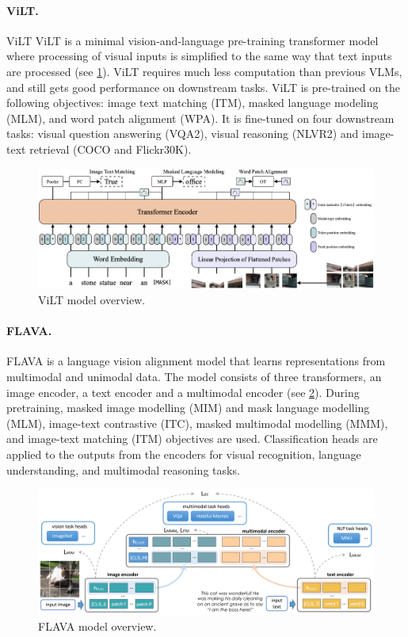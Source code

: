 \paragraph{ViLT.} ViLT \cite{kim2021vilt} ViLT is a minimal vision-and-language pre-training transformer model where processing of visual inputs is simplified to the same way that text inputs are processed (see \cref{fig:vilt}). ViLT requires much less computation than previous VLMs, and still gets good performance on downstream tasks. ViLT is pre-trained on the following objectives: image text matching (ITM), masked language modeling (MLM), and word patch alignment (WPA). It is fine-tuned on four downstream tasks: visual question answering (VQA2), visual reasoning (NLVR2) and image-text retrieval (COCO and Flickr30K).

\begin{figure}[ht]
    \centering
    \includegraphics[width=\linewidth]{images/models/vilt.png}
    \caption{ViLT model overview.}
    \label{fig:vilt}
\end{figure}

\paragraph{FLAVA.} FLAVA \cite{singh2022flava} is a language vision alignment model that learns representations from multimodal and unimodal data. The model consists of three transformers, an image encoder, a text encoder and a multimodal encoder (see \cref{fig:flava}). During pretraining, masked image modelling (MIM) and mask language modelling (MLM), image-text contrastive (ITC), masked multimodal modelling (MMM), and image-text matching (ITM) objectives are used. Classification heads are applied to the outputs from the encoders for visual recognition, language understanding, and multimodal reasoning tasks.

\begin{figure}[ht]
    \centering
    \includegraphics[width=\linewidth]{images/models/flava.png}
    \caption{FLAVA model overview.}
    \label{fig:flava}
\end{figure}

